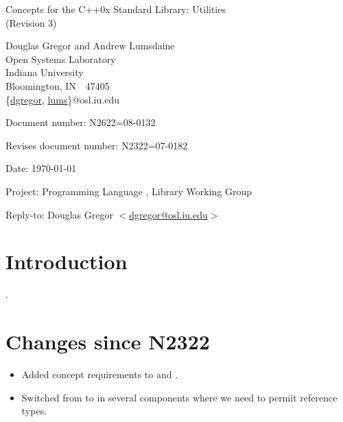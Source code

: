 \documentclass[american,twoside]{book}
\begin{document}
\raggedbottom

\begin{titlepage}
\begin{center}
\huge
Concepts for the C++0x Standard Library: Utilities\\
(Revision 3)

\vspace{0.5in}

\normalsize
Douglas Gregor and Andrew Lumsdaine \\
Open Systems Laboratory \\
Indiana University \\
Bloomington, IN\ \  47405 \\
\{\href{mailto:dgregor@osl.iu.edu}{dgregor}, \href{mailto:lums@osl.iu.edu}{lums}\}@osl.iu.edu
\end{center}

\vspace{1in}
\par\noindent Document number: N2622=08-0132\vspace{-6pt}
\par\noindent Revises document number: N2322=07-0182\vspace{-6pt}
\par\noindent Date: \today\vspace{-6pt}
\par\noindent Project: Programming Language \Cpp{}, Library Working Group\vspace{-6pt}
\par\noindent Reply-to: Douglas Gregor $<$\href{mailto:dgregor@osl.iu.edu}{dgregor@osl.iu.edu}$>$\vspace{-6pt}

\section*{Introduction}
.

\section*{Changes since N2322}
\begin{itemize}
\item Added concept requirements to  and
  .
\item Switched from  to  in
  several components where we need to permit reference types.
\end{itemize}

\end{titlepage}
\end{document}

